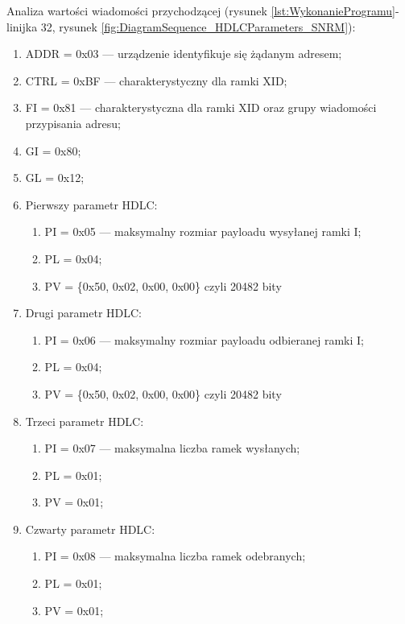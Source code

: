 \bigskip
Analiza wartości wiadomości przychodzącej 
(rysunek \ref{lst:WykonanieProgramu}- linijka 32, rysunek \ref{fig:DiagramSequence_HDLCParameters_SNRM}):
\begin{enumerate}
    \item ADDR = 0x03 --- urządzenie identyfikuje się żądanym adresem;
    \item CTRL = 0xBF --- charakterystyczny dla ramki XID;
    \item FI = 0x81 --- charakterystyczna dla ramki XID oraz grupy wiadomości przypisania adresu;
    \item GI = 0x80;
    \item GL = 0x12;
    \item Pierwszy parametr HDLC:
    \begin{enumerate}
        \item PI = 0x05 --- maksymalny rozmiar payloadu wysyłanej ramki I;
        \item PL = 0x04;
        \item PV = \{0x50, 0x02, 0x00, 0x00\} czyli 20482 bity
    \end{enumerate}
    \item Drugi parametr HDLC:
    \begin{enumerate}
        \item PI = 0x06 --- maksymalny rozmiar payloadu odbieranej ramki I;
        \item PL = 0x04;
        \item PV = \{0x50, 0x02, 0x00, 0x00\} czyli 20482 bity
    \end{enumerate}
    \item Trzeci parametr HDLC:
    \begin{enumerate}
        \item PI = 0x07 --- maksymalna liczba ramek wysłanych;
        \item PL = 0x01;
        \item PV = 0x01;
    \end{enumerate}
    \item Czwarty parametr HDLC:
    \begin{enumerate}
        \item PI = 0x08 --- maksymalna liczba ramek odebranych;
        \item PL = 0x01;
        \item PV = 0x01;
    \end{enumerate}
\end{enumerate}


